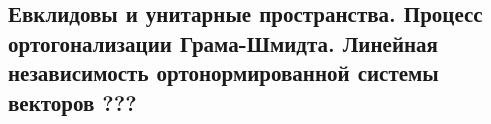 {
\subsection{Евклидовы и унитарные пространства. Процесс ортогонализации Грама-Шмидта. Линейная независимость ортонормированной системы векторов ???}
}